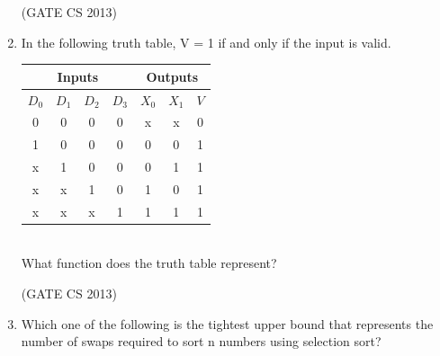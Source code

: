 \documentclass[a4paper, 11pt]{article}
\begin{document}
\begin{enumerate}
    \hfill (GATE CS 2013)
    
    \item In the following truth table, V = 1 if and only if the input is valid. \\
    \begin{table}[H]
    \centering
    \begin{tabular}{|c|c|c|c||c|c|c|}
    \hline
    \multicolumn{4}{|c||}{\textbf{Inputs}} & \multicolumn{3}{c|}{\textbf{Outputs}} \\ \hline
    $D_0$ & $D_1$ & $D_2$ & $D_3$ & $X_0$ & $X_1$ & $V$ \\ \hline
    0 & 0 & 0 & 0 & x & x & 0 \\ \hline
    1 & 0 & 0 & 0 & 0 & 0 & 1 \\ \hline
    x & 1 & 0 & 0 & 0 & 1 & 1 \\ \hline
    x & x & 1 & 0 & 1 & 0 & 1 \\ \hline
    x & x & x & 1 & 1 & 1 & 1 \\ \hline
    \end{tabular}
    \end{table}\\
    What function does the truth table represent? 
    \begin{enumerate}
    \end{enumerate}
    
    \hfill (GATE CS 2013)
    
    \item Which one of the following is the tightest upper bound that represents the number of swaps required to sort n numbers using selection sort?  
    \begin{enumerate}
    \end{enumerate}
    

\end{enumerate}
\end{document}
